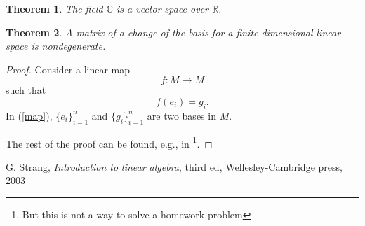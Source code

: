\documentclass[11pt]{amsart}
\newcommand{\R}{\mathbb R}
\newcommand{\C}{\mathbb C}
\newtheorem{theorem}{Theorem}
\begin{document}
\begin{theorem} 
The field $\C$ is a vector space over $\R$.
\end{theorem}

\begin{theorem}
A matrix of a change of the basis for a finite dimensional 
linear space is nondegenerate.  
\end{theorem}

\begin{proof} 

Consider a linear map 
$$f : M \to M$$  
such that  
\begin{equation} \label{map}
 f(e_i) = g_i. 
\end{equation} 
In (\ref{map}), $\{e_i\}_{i=1}^n$ and $\{ g_i \}_{i=1}^n$ are two bases 
in $M$. 

The rest of the proof can be found, e.g.,  
in \cite{S}\footnote{But this is not a 
way to solve a homework problem}. 
\end{proof}

\begin{thebibliography}{2}

 G. Strang, {\it Introduction to linear algebra}, third ed, 
Wellesley-Cambridge press, 2003

\end{thebibliography}
\end{document}
